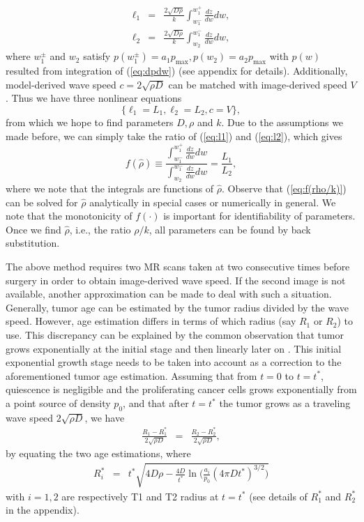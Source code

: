 \documentclass{aims}
\numberwithin{equation}{section}
\begin{document}
\begin{subequations}
\begin{eqnarray}
\ell_{1} & = & \frac{2\sqrt{D\rho}}{k}\int_{w_{1}^{-}}^{w_{1}^{+}}\frac{dz}{dw}dw,\label{eq:l1}\\
\ell_{2} & = & \frac{2\sqrt{D\rho}}{k}\int_{w_{2}}^{w_{1}^{-}}\frac{dz}{dw}dw,\label{eq:l2}
\end{eqnarray}
\end{subequations}
where $w_{1}^{\pm}$ and $w_{2}$ satisfy $p(w_{1}^{\pm})=a_{1}p_{\text{max}},p(w_{2})=a_{2}p_{\max}$ with $p(w)$ resulted from integration of (\ref{eq:dpdw}) (see appendix for details). Additionally, model-derived wave
speed $c=2\sqrt{\rho D}$ can be matched with image-derived speed
$V$. Thus we have three nonlinear equations
\begin{equation}
\{\ell_{1}=L_{1},\ell_{2}=L_{2},c=V\},\label{eq:l1l2c}
\end{equation}
from which we hope to find parameters $D,\rho$ and $k$. Due
to the assumptions we made before, we can simply take the ratio of
(\ref{eq:l1}) and (\ref{eq:l2}), which gives
\begin{equation}
f(\hat{\rho})\equiv\frac{\int_{w_{1}^{-}}^{w_{1}^{+}}\frac{dz}{dw}dw}{\int_{w_{2}}^{w_{1}^{-}}\frac{dz}{dw}dw}=\frac{L_{1}}{L_{2}},\label{eq:f(rho/k)}
\end{equation}
where we note that the integrals are functions of $\hat{\rho}$. Observe that (\ref{eq:f(rho/k)})
can be solved for $\hat{\rho}$ analytically in special cases or numerically
in general. We note that the monotonicity of $f(\cdot)$ is important
for identifiability of parameters. Once we find $\hat{\rho}$, i.e., the ratio $\rho /k$, all parameters can be found by back substitution.

The above method requires two MR scans taken at two consecutive times
before surgery in order to obtain image-derived wave speed. If the
second image is not available, another approximation can be made to
deal with such a situation. Generally, tumor age can be estimated by the
tumor radius divided by the wave speed. However, age estimation differs
in terms of which radius (say $R_{1}$ or $R_{2}$) to use. This discrepancy
can be explained by the common observation that tumor grows exponentially
at the initial stage and then linearly later on \cite{Kuang}. This
initial exponential growth stage needs to be taken into account as
a correction to the aforementioned tumor age estimation. Assuming that from $t=0$ to $t=t^{*}$, quiescence is negligible and the proliferating cancer cells grows exponentially from a point source of density $p_0$, and that after $t=t^*$
the tumor grows as a traveling wave speed $2\sqrt{\rho D}$, we have
\begin{eqnarray} \label{eq:age est}
\frac{R_1-R_1^*}{2\sqrt{\rho D}}& = & \frac{R_{2}-R_2^*}{2\sqrt{\rho D}},
\end{eqnarray} 
by equating the two age estimations, where 
\begin{eqnarray} \label{eq:Rstar}
R^*_{i} & = & t^* \sqrt{4D\rho - \frac{4D}{t^*} \ln\bigg( \frac{a_i}{p_0} ( 4\pi D t^*)^{3/2} \bigg)}
\end{eqnarray}  
with $i=1,2$ are respectively T1 and T2 radius at $t=t^*$ (see details of $R_1^*$ and $R_2^*$ in the appendix). 
\end{document}
